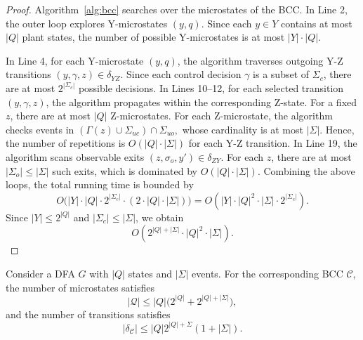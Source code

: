 \documentclass[journal,twoside,web]{ieeecolor}
\begin{document}
\begin{proof}
Algorithm~\ref{alg:bcc} searches over the microstates of the BCC.
%
In Line 2, the outer loop explores Y-microstates $(y,q)$. Since each
$y\in Y$ contains at most $|Q|$ plant states, the number of possible
Y-microstates is at most $|Y|\cdot |Q|$.

In Line 4, for each Y-microstate $(y,q)$, the algorithm traverses outgoing
Y-Z transitions $(y, \gamma, z)\in\delta_{YZ}$. Since each control decision
$\gamma$ is a subset of $\Sigma_c$, there are at most $2^{|\Sigma_c|}$
possible decisions.
%
In Lines 10--12, for each selected transition $(y, \gamma, z)$, the algorithm
propagates within the corresponding Z-state. For a fixed $z$, there are at
most $|Q|$ Z-microstates. For each Z-microstate, the algorithm checks events
in
$
    (\Gamma(z) \cup \Sigma_{uc}) \cap \Sigma_{uo},
$
whose cardinality is at most $|\Sigma|$. Hence, the number of repetitions is
$
    O(|Q|\cdot|\Sigma|)
$
for each Y-Z transition.
%
In Line 19, the algorithm scans observable exits
$(z, \sigma_o, y') \in \delta_{ZY}$. For each $z$, there are at most
$|\Sigma_o| \le |\Sigma|$ such exits, which is dominated by
$
    O(|Q| \cdot |\Sigma|)
$.
%
Combining the above loops, the total running time is bounded by
$$
    O\big(
    |Y| \cdot |Q| \cdot 2^{|\Sigma_c|}
    \cdot (2 \cdot |Q| \cdot |\Sigma|)
    \big)
    =
    O(|Y|\cdot |Q|^2\cdot |\Sigma|\cdot 2^{|\Sigma_c|}).
$$
Since $|Y| \le 2^{|Q|}$ and $|\Sigma_c| \le |\Sigma|$, we obtain
$$
    O(2^{|Q|+|\Sigma|} \cdot |Q|^2\cdot |\Sigma|).
$$
\end{proof}

%
\begin{proposition}\label{prop:state_bcc}
Consider a DFA $G$ with $|Q|$ states and $|\Sigma|$ events.
For the corresponding BCC $\mathcal{C}$, the number of microstates satisfies
$$
    |\bm{\mathcal{Q}}| \leq |Q|\big(2^{|Q|}+2^{|Q|+|\Sigma|}\big),
$$
and the number of transitions satisfies
$$
    |\delta_{\mathcal{C}}| \leq |Q|2^{|Q| + \Sigma}(1 + |\Sigma|).
$$
\end{proposition}
\end{document}
